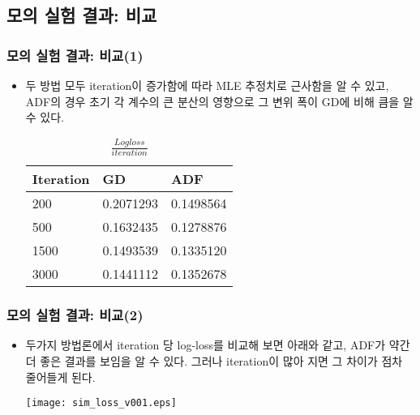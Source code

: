 \documentclass{beamer}
\begin{document}

\subsection{모의 실험 결과: 비교} %


\begin{frame}
\frametitle{모의 실험 결과: 비교(1)}

\begin{itemize}
\item 두 방법 모두 iteration이 증가함에 따라 MLE 추정치로 근사함을 알 수 있고, ADF의 경우 초기 각 계수의 큰 분산의 영향으로 그 변위 폭이 GD에 비해 큼을 알 수 있다.
\begin{table}
\begin{tabular}{l l l}
\toprule
\textbf{Iteration} & \textbf{GD} & \textbf{ADF} \\
\midrule
 200 & 0.2071293 & 0.1498564 \\
 500 & 0.1632435 & 0.1278876 \\
1500 & 0.1493539 & 0.1335120 \\
3000 & 0.1441112 & 0.1352678 \\
\bottomrule
\end{tabular}
\caption{$\frac{Log loss}{iteration}$}
\end{table}


\end{itemize}
\end{frame}





\begin{frame}
\frametitle{모의 실험 결과: 비교(2)}

\begin{itemize}
\item 두가지 방법론에서 iteration 당 log-loss를 비교해 보면 아래와 같고, ADF가 약간 더 좋은 결과를 보임을 알 수 있다. 그러나 iteration이 많아 지면 그 차이가 점차 줄어들게 된다.

\begin{center}
\texttt{[image: sim\_loss\_v001.eps]} %
\end{center}


\end{itemize}
\end{frame}
\end{document}
